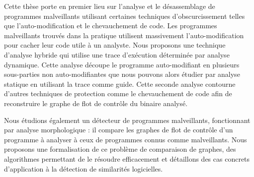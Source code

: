 Cette thèse porte en premier lieu sur l'analyse et le désassemblage de programmes malveillants utilisant certaines techniques d'obscurcissement telles que l'auto-modification et le chevauchement de code.
Les programmes malveillants trouvés dans la pratique utilisent massivement l'auto-modification pour cacher leur code utile à un analyste.
Nous proposons une technique d'analyse hybride qui utilise une trace d'exécution déterminée par analyse dynamique.
Cette analyse découpe le programme auto-modifiant en plusieurs sous-parties non auto-modifiantes que nous pouvons alors étudier par analyse statique en utilisant la trace comme guide.
Cette seconde analyse contourne d'autres techniques de protection comme le chevauchement de code afin de reconstruire le graphe de flot de contrôle du binaire analysé.

Nous étudions également un détecteur de programmes malveillants, fonctionnant par analyse morphologique : il compare les graphes de flot de contrôle d'un programme à analyser à ceux de programmes connus comme malveillants.
Nous proposons une formalisation de ce problème de comparaison de graphes, des algorithmes permettant de le résoudre efficacement et détaillons des cas concrets d'application à la détection de similarités logicielles.